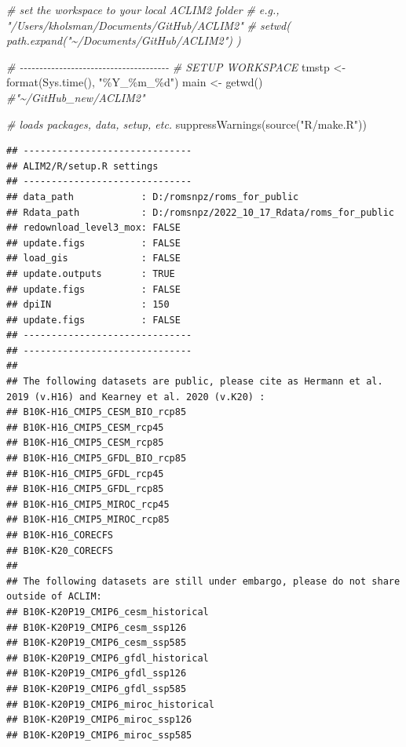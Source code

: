 \documentclass[
]{article}
\newenvironment{Shaded}{\begin{snugshade}}{\end{snugshade}}
\newcommand{\CommentTok}[1]{\textcolor[rgb]{0.56,0.35,0.01}{\textit{#1}}}
\newcommand{\FunctionTok}[1]{\textcolor[rgb]{0.00,0.00,0.00}{#1}}
\newcommand{\NormalTok}[1]{#1}
\newcommand{\OtherTok}[1]{\textcolor[rgb]{0.56,0.35,0.01}{#1}}
\newcommand{\StringTok}[1]{\textcolor[rgb]{0.31,0.60,0.02}{#1}}
\begin{document}
\begin{Shaded}
\begin{Highlighting}[]
    \CommentTok{\# set the workspace to your local ACLIM2 folder}
    \CommentTok{\# e.g., "/Users/kholsman/Documents/GitHub/ACLIM2"}
    \CommentTok{\# setwd( path.expand("\textasciitilde{}/Documents/GitHub/ACLIM2") )}
   
    \CommentTok{\# {-}{-}{-}{-}{-}{-}{-}{-}{-}{-}{-}{-}{-}{-}{-}{-}{-}{-}{-}{-}{-}{-}{-}{-}{-}{-}{-}{-}{-}{-}{-}{-}{-}{-}{-}{-}{-}{-}}
    \CommentTok{\# SETUP WORKSPACE}
\NormalTok{    tmstp  }\OtherTok{\textless{}{-}} \FunctionTok{format}\NormalTok{(}\FunctionTok{Sys.time}\NormalTok{(), }\StringTok{"\%Y\_\%m\_\%d"}\NormalTok{)}
\NormalTok{    main   }\OtherTok{\textless{}{-}} \FunctionTok{getwd}\NormalTok{()  }\CommentTok{\#"\textasciitilde{}/GitHub\_new/ACLIM2"}
    
    \CommentTok{\# loads packages, data, setup, etc.}
    \FunctionTok{suppressWarnings}\NormalTok{(}\FunctionTok{source}\NormalTok{(}\StringTok{"R/make.R"}\NormalTok{))}
\end{Highlighting}
\end{Shaded}

\begin{verbatim}
## ------------------------------
## ALIM2/R/setup.R settings 
## ------------------------------
## data_path            : D:/romsnpz/roms_for_public 
## Rdata_path           : D:/romsnpz/2022_10_17_Rdata/roms_for_public 
## redownload_level3_mox: FALSE 
## update.figs          : FALSE 
## load_gis             : FALSE 
## update.outputs       : TRUE 
## update.figs          : FALSE 
## dpiIN                : 150 
## update.figs          : FALSE 
## ------------------------------
## ------------------------------
## 
## The following datasets are public, please cite as Hermann et al. 2019 (v.H16) and Kearney et al. 2020 (v.K20) :
## B10K-H16_CMIP5_CESM_BIO_rcp85 
## B10K-H16_CMIP5_CESM_rcp45 
## B10K-H16_CMIP5_CESM_rcp85 
## B10K-H16_CMIP5_GFDL_BIO_rcp85 
## B10K-H16_CMIP5_GFDL_rcp45 
## B10K-H16_CMIP5_GFDL_rcp85 
## B10K-H16_CMIP5_MIROC_rcp45 
## B10K-H16_CMIP5_MIROC_rcp85 
## B10K-H16_CORECFS 
## B10K-K20_CORECFS 
## 
## The following datasets are still under embargo, please do not share outside of ACLIM:
## B10K-K20P19_CMIP6_cesm_historical 
## B10K-K20P19_CMIP6_cesm_ssp126 
## B10K-K20P19_CMIP6_cesm_ssp585 
## B10K-K20P19_CMIP6_gfdl_historical 
## B10K-K20P19_CMIP6_gfdl_ssp126 
## B10K-K20P19_CMIP6_gfdl_ssp585 
## B10K-K20P19_CMIP6_miroc_historical 
## B10K-K20P19_CMIP6_miroc_ssp126 
## B10K-K20P19_CMIP6_miroc_ssp585
\end{verbatim}
\end{document}
